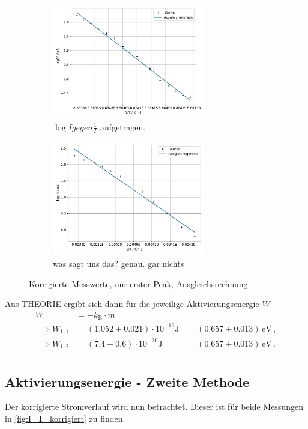   \begin{figure}
    \begin{subfigure}[b]{.5\linewidth}
      \centering
      \includegraphics[height=5cm, keepaspectratio]{build/log(I)_1durchT_1.pdf}
      \caption{$\log{I} gegen \frac{1}{T}$ aufgetragen.}
      \label{fig:log_I_1_durch_T_Messung_1}
    \end{subfigure}

    \begin{subfigure}[b]{.5\linewidth}
      \centering
      \includegraphics[height=5cm, keepaspectratio]{build/log(I)_1durchT_2.pdf}
      \caption{was sagt uns das? genau. gar nichts}
      \label{fig:log_I_1_durch_T_Messung 2}
    \end{subfigure}
    \caption{Korrigierte Messwerte, nur erster Peak, Ausgleichsrechnung}
  \end{figure} %

  \noindent
  Aus THEORIE ergibt sich dann für die jeweilige Aktivierungsenergie $W$
  \begin{align*}
    W   &= -k_\text{B} \cdot m \\
    \implies W_{1,1} &= (1.052 \pm 0.021) \cdot 10^{-19} \si{\joule} &= (0.657 \pm 0.013) \, \si{\electronvolt} \, , \\
    \implies W_{1,2} &= (7.4 \pm 0.6) \cdot 10^{-20} \si{\joule} &= (0.657 \pm 0.013) \, \si{\electronvolt}  \, .\\
  \end{align*}

\subsection{Aktivierungsenergie - Zweite Methode}
  Der korrigierte Stromverlauf wird nun betrachtet.
  Dieser ist für beide Messungen in \autoref{fig:I_T_korrigiert} zu finden.

